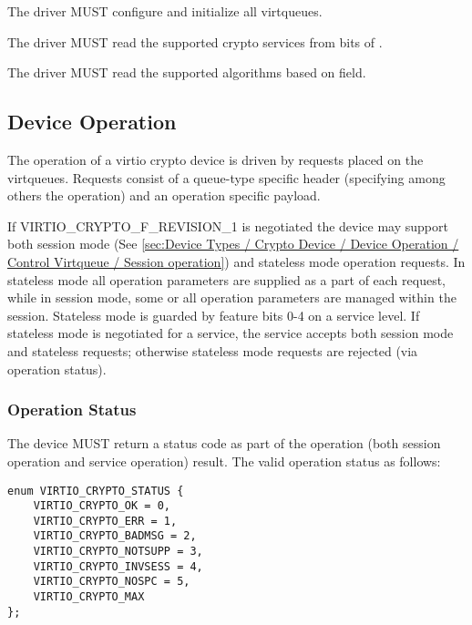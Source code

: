\begin{itemize*}
\item The driver MUST configure and initialize all virtqueues.
\item The driver MUST read the supported crypto services from bits of .
\item The driver MUST read the supported algorithms based on  field.
\end{itemize*}

\subsection{Device Operation}\label{sec:Device Types / Crypto Device / Device Operation}

The operation of a virtio crypto device is driven by requests placed on the virtqueues.
Requests consist of a queue-type specific header (specifying among others the operation)
and an operation specific payload.

If VIRTIO_CRYPTO_F_REVISION_1 is negotiated the device may support both session mode
(See \ref{sec:Device Types / Crypto Device / Device Operation / Control Virtqueue / Session operation})
and stateless mode operation requests.
In stateless mode all operation parameters are supplied as a part of each request,
while in session mode, some or all operation parameters are managed within the
session. Stateless mode is guarded by feature bits 0-4 on a service level. If
stateless mode is negotiated for a service, the service accepts both session
mode and stateless requests; otherwise stateless mode requests are rejected
(via operation status).

\subsubsection{Operation Status}\label{sec:Device Types / Crypto Device / Device Operation / Operation status}
The device MUST return a status code as part of the operation (both session
operation and service operation) result. The valid operation status as follows:

\begin{lstlisting}
enum VIRTIO_CRYPTO_STATUS {
    VIRTIO_CRYPTO_OK = 0,
    VIRTIO_CRYPTO_ERR = 1,
    VIRTIO_CRYPTO_BADMSG = 2,
    VIRTIO_CRYPTO_NOTSUPP = 3,
    VIRTIO_CRYPTO_INVSESS = 4,
    VIRTIO_CRYPTO_NOSPC = 5,
    VIRTIO_CRYPTO_MAX
};
\end{lstlisting}

